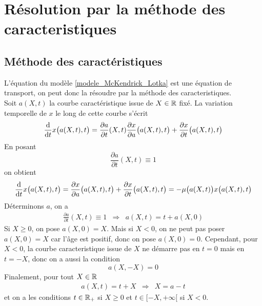 \section{Résolution par la méthode des caracteristiques}

\subsection{Méthode des caractéristiques}
L'équation du modèle \eqref{modele_McKendrick_Lotka} est une équation de transport, on peut donc la résoudre par la méthode des caracteristiques.
\\
Soit $a(X,t)$ la courbe caractéristique issue de $X \in \mathbb{R}$ fixé. La variation temporelle de $x$ le long de cette courbe s'écrit 
\begin{eqnarray*}
    \frac{\mathrm{d}}{\mathrm{d} t}x\big(a(X,t),t\big) = \frac{\partial a}{\partial t}
    (X,t)\frac{\partial x}{\partial a}\big(a(X,t),t\big)+\frac{\partial x}{\partial t}
    \big(a(X,t),t \big)
\end{eqnarray*}
En posant 
\begin{equation*}
    \frac{\partial a}{\partial t}(X,t) \equiv 1
\end{equation*}
on obtient 
\begin{eqnarray*}
    \frac{\mathrm{d}}{\mathrm{d} t}x\big(a(X,t),t\big) = 
    \frac{\partial x}{\partial a}\big(a(X,t),t\big)+\frac{\partial x}{\partial t}
    \big(a(X,t),t \big) = -\mu\big(a(X,t)\big)x\big(a(X,t),t\big)
\end{eqnarray*}
Déterminons $a$, on a 
\begin{eqnarray*}
    \frac{\partial a}{\partial t}(X,t) \equiv 1 
    &\Longrightarrow& a(X,t) = t + a(X,0)
\end{eqnarray*}
Si $X \geq 0$, on pose $a(X,0)=X$. Mais si $X<0$, on ne peut pas poser $a(X,0)=X$ car l'âge est positif, donc on pose $a(X,0)=0$. Cependant, pour $X<0$, la courbe caracteristique issue de $X$ ne démarre pas en $t=0$ mais en $t=-X$, donc on a aussi la condition 
\begin{equation*}
    a(X,-X) = 0
\end{equation*}
Finalement, pour tout $X \in \mathbb{R}$
\begin{eqnarray*}
    a(X,t) = t+X &\Longrightarrow& X = a-t
\end{eqnarray*}
et on a les conditions $t \in \mathbb{R}_+$ si $X \geq 0$ et $t \in [-X,+\infty[$ si $X<0$. 
